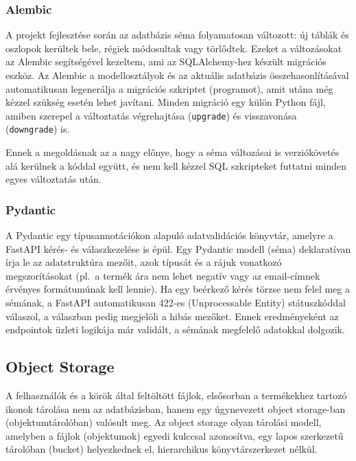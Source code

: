 \subsubsection{Alembic}

A projekt fejlesztése során az adatbázis séma folyamatosan változott: új táblák és oszlopok kerültek bele, régiek módosultak vagy törlődtek. Ezeket a változásokat az Alembic \cite{Alembic} segítségével kezeltem, ami az SQLAlchemy-hez készült migrációs eszköz. Az Alembic a modellosztályok és az aktuális adatbázis összehasonlításával automatikusan legenerálja a migrációs szkriptet (programot), amit utána még kézzel szükség esetén lehet javítani. Minden migráció egy külön Python fájl, amiben szerepel a változtatás végrehajtása (\texttt{upgrade}) és visszavonása (\texttt{downgrade}) is.

Ennek a megoldásnak az a nagy előnye, hogy a séma változásai is verziókövetés alá kerülnek a kóddal együtt, és nem kell kézzel SQL szkripteket futtatni minden egyes változtatás után.

\subsubsection{Pydantic}

A Pydantic \cite{Pydantic} egy típusannotációkon alapuló adatvalidációs könyvtár, amelyre a FastAPI kérés- és válaszkezelése is épül. Egy Pydantic modell (séma) deklaratívan írja le az adatstruktúra mezőit, azok típusát és a rájuk vonatkozó megszorításokat (pl.\ a termék ára nem lehet negatív vagy az email-címnek érvényes formátumúnak kell lennie). Ha egy beérkező kérés törzse nem felel meg a sémának, a FastAPI automatikusan 422-es (Unprocessable Entity) státuszkóddal válaszol, a válaszban pedig megjelöli a hibás mezőket. Ennek eredményeként az endpointok üzleti logikája már validált, a sémának megfelelő adatokkal dolgozik.

\subsection{Object Storage}

A felhasználók és a körök által feltöltött fájlok, elsősorban a termékekhez tartozó ikonok tárolása nem az adatbázisban, hanem egy úgynevezett object storage-ban (objektumtárolóban) valósult meg. Az object storage olyan tárolási modell, amelyben a fájlok (objektumok) egyedi kulccsal azonosítva, egy lapos szerkezetű tárolóban (bucket) helyezkednek el, hierarchikus könyvtárszerkezet nélkül.

